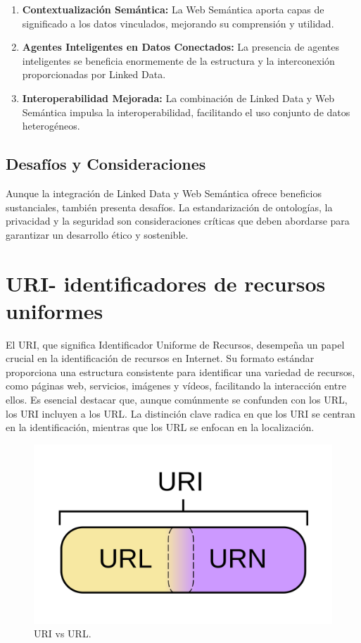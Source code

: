 \documentclass[11pt]{report}
\begin{document}
	\begin{enumerate}
		\item \textbf{Contextualización Semántica:} La Web Semántica aporta capas de significado a los datos vinculados, mejorando su comprensión y utilidad.
		
		\item \textbf{Agentes Inteligentes en Datos Conectados:} La presencia de agentes inteligentes se beneficia enormemente de la estructura y la interconexión proporcionadas por Linked Data.
		
		\item \textbf{Interoperabilidad Mejorada:} La combinación de Linked Data y Web Semántica impulsa la interoperabilidad, facilitando el uso conjunto de datos heterogéneos.
	\end{enumerate}
	
	\section*{Desafíos y Consideraciones}
	
	Aunque la integración de Linked Data y Web Semántica ofrece beneficios sustanciales, también presenta desafíos. La estandarización de ontologías, la privacidad y la seguridad son consideraciones críticas que deben abordarse para garantizar un desarrollo ético y sostenible.
	
	\chapter{URI- identificadores de recursos uniformes}
	El URI, que significa Identificador Uniforme de Recursos, desempeña un papel crucial en la identificación de recursos en Internet. Su formato estándar proporciona una estructura consistente para identificar una variedad de recursos, como páginas web, servicios, imágenes y vídeos, facilitando la interacción entre ellos. Es esencial destacar que, aunque comúnmente se confunden con los URL, los URI incluyen a los URL. La distinción clave radica en que los URI se centran en la identificación, mientras que los URL se enfocan en la localización.
	\begin{figure}[H]
		\centering
		\includegraphics[scale=0.3]{../img/uri.png}
		\caption{URI vs URL.}
		\label{fig:uri}
	\end{figure}
\end{document}
